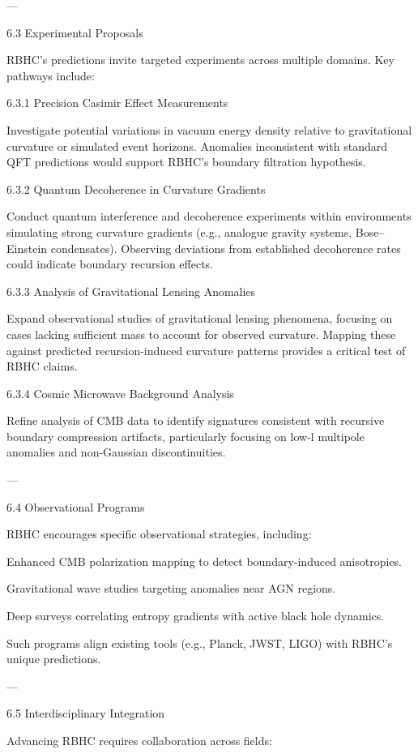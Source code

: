 \documentclass[11pt,a4paper]{article}
\begin{document}
---

6.3 Experimental Proposals

RBHC’s predictions invite targeted experiments across multiple domains. Key pathways include:

6.3.1 Precision Casimir Effect Measurements

Investigate potential variations in vacuum energy density relative to gravitational curvature or simulated event horizons. Anomalies inconsistent with standard QFT predictions would support RBHC’s boundary filtration hypothesis.

6.3.2 Quantum Decoherence in Curvature Gradients

Conduct quantum interference and decoherence experiments within environments simulating strong curvature gradients (e.g., analogue gravity systems, Bose–Einstein condensates). Observing deviations from established decoherence rates could indicate boundary recursion effects.

6.3.3 Analysis of Gravitational Lensing Anomalies

Expand observational studies of gravitational lensing phenomena, focusing on cases lacking sufficient mass to account for observed curvature. Mapping these against predicted recursion-induced curvature patterns provides a critical test of RBHC claims.

6.3.4 Cosmic Microwave Background Analysis

Refine analysis of CMB data to identify signatures consistent with recursive boundary compression artifacts, particularly focusing on low-l multipole anomalies and non-Gaussian discontinuities.


---

6.4 Observational Programs

RBHC encourages specific observational strategies, including:

Enhanced CMB polarization mapping to detect boundary-induced anisotropies.

Gravitational wave studies targeting anomalies near AGN regions.

Deep surveys correlating entropy gradients with active black hole dynamics.


Such programs align existing tools (e.g., Planck, JWST, LIGO) with RBHC’s unique predictions.


---

6.5 Interdisciplinary Integration

Advancing RBHC requires collaboration across fields:
\end{document}
